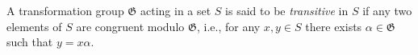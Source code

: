 A transformation group $\mathfrak{G}$ acting in a set $S$ is said to be \textit{transitive} in $S$ if any two elements of $S$ are congruent modulo $\mathfrak{G}$, i.e., for any $x, y \in S$ there exists $\alpha \in \mathfrak{G}$ such that $y = x\alpha$.
